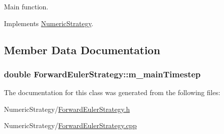Main function. 



Implements \hyperlink{class_numeric_strategy_aeab387274e9d0ebf46a0e5ad5a5fe73f}{Numeric\+Strategy}.



\subsection{Member Data Documentation}
\hypertarget{class_forward_euler_strategy_aa7cb67aa11fb16d4a76c1944ad3dbbc4}{
\subsubsection[{m\+\_\+main\+Timestep}]{\setlength{\rightskip}{0pt plus 5cm}double Forward\+Euler\+Strategy\+::m\+\_\+main\+Timestep}}\label{class_forward_euler_strategy_aa7cb67aa11fb16d4a76c1944ad3dbbc4}


The documentation for this class was generated from the following files\+:\begin{DoxyCompactItemize}
\item 
Numeric\+Strategy/\hyperlink{_forward_euler_strategy_8h}{Forward\+Euler\+Strategy.\+h}\item 
Numeric\+Strategy/\hyperlink{_forward_euler_strategy_8cpp}{Forward\+Euler\+Strategy.\+cpp}\end{DoxyCompactItemize}
